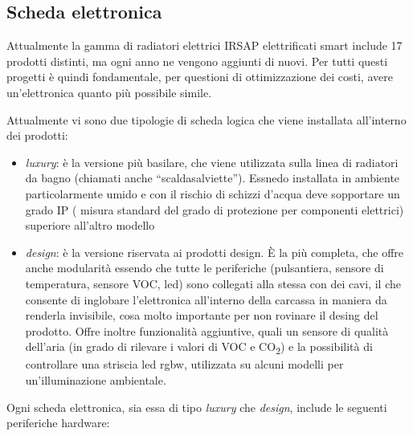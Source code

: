 \documentclass[12pt,a4paper,twoside,titlepage]{book}
\begin{document}
\subsection{Scheda elettronica}

Attualmente la gamma di radiatori elettrici IRSAP elettrificati smart include 17 prodotti distinti, 
ma ogni anno ne vengono aggiunti di nuovi. Per tutti questi progetti è quindi fondamentale, per 
questioni di ottimizzazione dei costi, avere un'elettronica quanto più possibile simile. 

Attualmente vi sono due tipologie di scheda logica che viene installata all'interno dei prodotti:

\begin{itemize}
    \item \textit{luxury}: è la versione più basilare, che viene utilizzata sulla linea di
        radiatori da bagno (chiamati anche ``scaldasalviette''). Essnedo installata in ambiente 
        particolarmente umido e con il rischio di schizzi d'acqua deve sopportare un grado IP (
        misura standard del grado di protezione per componenti elettrici) superiore all'altro modello
    \item \textit{design}: è la versione riservata ai prodotti design. È la più completa,
        che offre anche modularità essendo che tutte le periferiche (pulsantiera, sensore di temperatura,
        sensore VOC, \acrshort{led}) sono collegati alla stessa con dei cavi, il che consente di inglobare l'elettronica 
        all'interno della carcassa in maniera da renderla invisibile, cosa molto importante per non rovinare 
        il desing del prodotto. Offre inoltre funzionalità aggiuntive, quali un sensore di qualità
        dell'aria (in grado di rilevare i valori di VOC e CO\textsubscript{2}) e la possibilità di
        controllare una striscia \acrshort{led} \Gls{rgbw}, utilizzata su alcuni modelli per un'illuminazione ambientale.
\end{itemize}


Ogni scheda elettronica, sia essa di tipo \textit{luxury} che \textit{design}, include le seguenti 
periferiche hardware:
\end{document}
